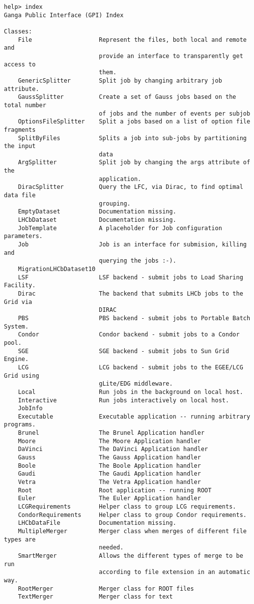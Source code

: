 \documentclass{howto}
\begin{document}
\begin{verbatim}
help> index
Ganga Public Interface (GPI) Index

Classes:
    File                   Represent the files, both local and remote and
                           provide an interface to transparently get access to
                           them.
    GenericSplitter        Split job by changing arbitrary job attribute.
    GaussSplitter          Create a set of Gauss jobs based on the total number
                           of jobs and the number of events per subjob
    OptionsFileSplitter    Split a jobs based on a list of option file fragments
    SplitByFiles           Splits a job into sub-jobs by partitioning the input
                           data
    ArgSplitter            Split job by changing the args attribute of the
                           application.
    DiracSplitter          Query the LFC, via Dirac, to find optimal data file
                           grouping.
    EmptyDataset           Documentation missing.
    LHCbDataset            Documentation missing.
    JobTemplate            A placeholder for Job configuration parameters.
    Job                    Job is an interface for submision, killing and
                           querying the jobs :-).
    MigrationLHCbDataset10
    LSF                    LSF backend - submit jobs to Load Sharing Facility.
    Dirac                  The backend that submits LHCb jobs to the Grid via
                           DIRAC
    PBS                    PBS backend - submit jobs to Portable Batch System.
    Condor                 Condor backend - submit jobs to a Condor pool.
    SGE                    SGE backend - submit jobs to Sun Grid Engine.
    LCG                    LCG backend - submit jobs to the EGEE/LCG Grid using
                           gLite/EDG middleware.
    Local                  Run jobs in the background on local host.
    Interactive            Run jobs interactively on local host.
    JobInfo
    Executable             Executable application -- running arbitrary programs.
    Brunel                 The Brunel Application handler
    Moore                  The Moore Application handler
    DaVinci                The DaVinci Application handler
    Gauss                  The Gauss Application handler
    Boole                  The Boole Application handler
    Gaudi                  The Gaudi Application handler
    Vetra                  The Vetra Application handler
    Root                   Root application -- running ROOT
    Euler                  The Euler Application handler
    LCGRequirements        Helper class to group LCG requirements.
    CondorRequirements     Helper class to group Condor requirements.
    LHCbDataFile           Documentation missing.
    MultipleMerger         Merger class when merges of different file types are
                           needed.
    SmartMerger            Allows the different types of merge to be run
                           according to file extension in an automatic way.
    RootMerger             Merger class for ROOT files
    TextMerger             Merger class for text



\end{verbatim}
\end{document}
